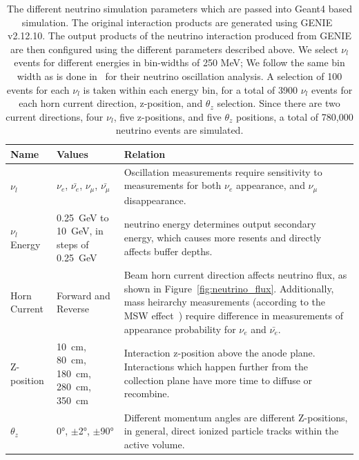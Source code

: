 \begin{table}
\begin{center}
\begin{tabular}{|| p{30mm} | p{30mm} | p{90mm} ||}
 \hline
 Name & Values & Relation \\ [0.5ex]
 \hline\hline
  $\nu_{l}$ & $\nu_{e}$, $\bar{\nu_{e}}$, $\nu_{\mu}$, $\bar{\nu_{\mu}}$ & Oscillation measurements require sensitivity to measurements for both $\nu_{e}$ appearance, and $\nu_{\mu}$ disappearance.\\
 \hline
  $\nu_{l}$ Energy & 0.25~\unit{GeV} to 10~\unit{GeV}, in steps of 0.25~\unit{GeV} & neutrino energy determines output secondary energy, which causes more resents and directly affects buffer depths. \\
 \hline
  Horn Current & Forward and Reverse & Beam horn current direction affects neutrino flux, as shown in Figure~\ref{fig:neutrino_flux}. Additionally, mass heirarchy measurements (according to the MSW effect~\citep{Smirnov2004TheME}) require difference in measurements of appearance probability for $\nu_{e}$ and $\bar{\nu_{e}}$. \\
 \hline
  Z-position & 10~\unit{cm}, 80~\unit{cm}, 180~\unit{cm}, 280~\unit{cm}, 350~\unit{cm}  & Interaction z-position above the anode plane. Interactions which happen further from the collection plane have more time to diffuse or recombine. \\
 \hline
  $\theta_{z} $ & 0\unit{\degree}, $\pm$2\unit{\degree}, $\pm$90\unit{\degree} & Different momentum angles are different Z-positions, in general, direct ionized particle tracks within the active volume. \\
 \hline
\end{tabular}
\caption{The different neutrino simulation parameters which are passed into Geant4 based simulation.
  The original interaction products are generated using GENIE~\citep{Andreopoulos:2009rq} v2.12.10.
  The output products of the neutrino interaction produced from GENIE are then configured using the different parameters described above.
  We select $\nu_{l}$ events for different energies in bin-widths of 250 MeV; We follow the same bin width as is done in~\citep{DUNE_FD_TDRv2_2020} for their neutrino oscillation analysis.
  A selection of 100 events for each $\nu_{l}$ is taken within each energy bin, for a total of 3900 $\nu_{l}$ events for each horn current direction, z-position, and $\theta_{z}$ selection.
  Since there are two current directions, four $\nu_{l}$, five z-positions, and five $\theta_{z}$ positions, a total of 780,000 neutrino events are simulated.
}
\label{table:neutrino_params}
\end{center}
\end{table}


